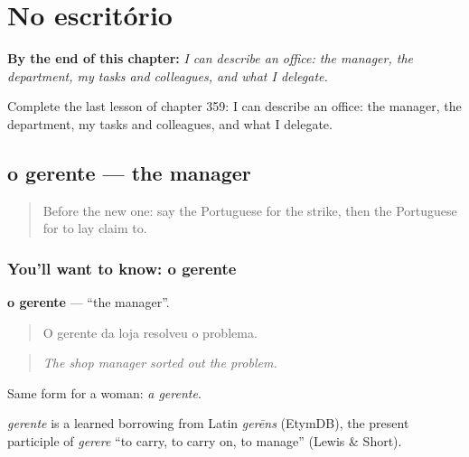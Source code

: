 
\chapter{No escritório}
\label{ch:pt-no-escritorio}

\begin{chapteropening}
\textbf{By the end of this chapter:} \emph{I can describe an office: the manager, the department, my tasks and colleagues, and what I delegate.}

Complete the last lesson of chapter 359: I can describe an office: the manager, the department, my tasks and colleagues, and what I delegate.
\end{chapteropening}

\section[o gerente]{o gerente — the manager}

\label{lesson:PT-C359-gerente}



\begin{quote}
Before the new one: say the Portuguese for the strike, then the Portuguese for to lay claim to.
\end{quote}

\subsection*{You'll want to know: o gerente}
\textbf{o gerente} — \textquotedblleft{}the manager\textquotedblright{}.

\begin{quote}
O gerente da loja resolveu o problema.
\end{quote}

\begin{quote}
\emph{The shop manager sorted out the problem.}
\end{quote}

Same form for a woman: \emph{a gerente}.

\begin{cousinweb}
\emph{gerente} is a learned borrowing from Latin \emph{gerēns} (EtymDB), the present participle of \emph{gerere} \textquotedblleft{}to carry, to carry on, to manage\textquotedblright{} (Lewis \& Short).
\end{cousinweb}

